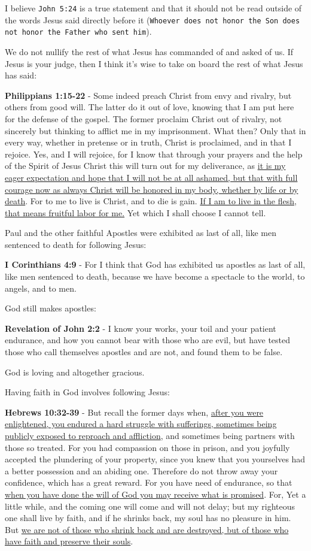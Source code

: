 \documentclass[11pt]{article}
\begin{document}
I believe \texttt{John 5:24} is a true statement and that it should not be read outside of the words Jesus said directly before it (\texttt{Whoever does not honor the Son does not honor the Father who sent him}).

We do not nullify the rest of what Jesus has commanded of and asked of us. If Jesus is your judge, then I think it's wise to take on board the rest of what Jesus has said:

\textbf{Philippians 1:15-22} - Some indeed preach Christ from envy and rivalry, but others from good will. The latter do it out of love, knowing that I am put here for the defense of the gospel. The former proclaim Christ out of rivalry, not sincerely but thinking to afflict me in my imprisonment. What then? Only that in every way, whether in pretense or in truth, Christ is proclaimed, and in that I rejoice. Yes, and I will rejoice, for I know that through your prayers and the help of the Spirit of Jesus Christ this will turn out for my deliverance, as \uline{it is my eager expectation and hope that I will not be at all ashamed, but that with full courage now as always Christ will be honored in my body, whether by life or by death}. For to me to live is Christ, and to die is gain. \uline{If I am to live in the flesh, that means fruitful labor for me.} Yet which I shall choose I cannot tell.

Paul and the other faithful Apostles were exhibited as last of all, like men sentenced to death for following Jesus:

\textbf{I Corinthians 4:9} - For I think that God has exhibited us apostles as last of all, like men sentenced to death, because we have become a spectacle to the world, to angels, and to men.

God still makes apostles:

\textbf{Revelation of John 2:2} - I know your works, your toil and your patient endurance, and how you cannot bear with those who are evil, but have tested those who call themselves apostles and are not, and found them to be false.

God is loving and altogether gracious.

Having faith in God involves following Jesus:

\textbf{Hebrews 10:32-39} - But recall the former days when, \uline{after you were enlightened, you endured a hard struggle with sufferings, sometimes being publicly exposed to reproach and affliction}, and sometimes being partners with those so treated. For you had compassion on those in prison, and you joyfully accepted the plundering of your property, since you knew that you yourselves had a better possession and an abiding one. Therefore do not throw away your confidence, which has a great reward. For you have need of endurance, so that \uline{when you have done the will of God you may receive what is promised}. For, Yet a little while, and the coming one will come and will not delay; but my righteous one shall live by faith, and if he shrinks back, my soul has no pleasure in him. But \uline{we are not of those who shrink back and are destroyed, but of those who have faith and preserve their souls}.
\end{document}
